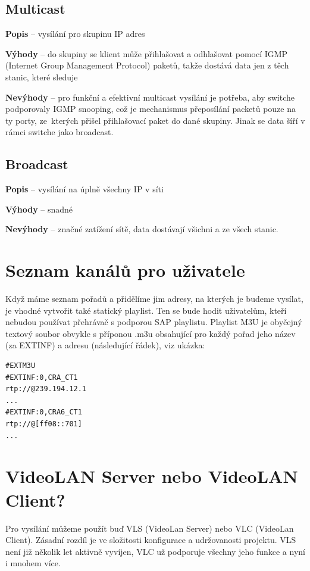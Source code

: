 \subsection{Multicast}
\bitem
\item \textbf{Popis} -- vysílání pro skupinu IP adres
\item \textbf{Výhody} -- do skupiny se klient může přihlašovat a odhlašovat pomocí IGMP (Internet Group Management Protocol) paketů, takže dostává data jen z těch stanic, které sleduje
\item \textbf{Nevýhody} -- pro funkční a efektivní multicast vysílání je potřeba, aby switche podporovaly IGMP snooping, což je mechanismus přeposílání packetů pouze na ty porty, ze~kterých přišel přihlašovací paket do dané skupiny. Jinak se data šíří v rámci switche jako broadcast.
\eitem
\vfill
\pagebreak
\subsection{Broadcast}
\bitem   
\item \textbf{Popis} -- vysílání na úplně všechny IP v síti
\item \textbf{Výhody} -- snadné
\item \textbf{Nevýhody} -- značné zatížení sítě, data dostávají všichni a ze všech stanic.
\eitem

\section{Seznam kanálů pro uživatele}
Když máme seznam pořadů a přidělíme jim adresy, na kterých je budeme vysílat, je vhodné vytvořit také statický playlist. Ten se bude hodit uživatelům, kteří nebudou používat přehrávač s podporou SAP playlistu. Playlist M3U je obyčejný textový soubor obvykle s příponou .m3u obsahující pro každý pořad jeho název (za EXTINF) a adresu (následující řádek), viz ukázka:

\begin{small}
\begin{verbatim}
#EXTM3U
#EXTINF:0,CRA_CT1
rtp://@239.194.12.1
...
#EXTINF:0,CRA6_CT1
rtp://@[ff08::701]
...
\end{verbatim}
\end{small}

\section{VideoLAN Server nebo VideoLAN Client?}
Pro vysílání můžeme použít buď VLS (VideoLan Server) nebo VLC (VideoLan Client). Zásadní rozdíl je ve složitosti konfigurace a udržovanosti projektu. VLS není již několik let aktivně vyvíjen, VLC už podporuje všechny jeho funkce a nyní i mnohem více.

